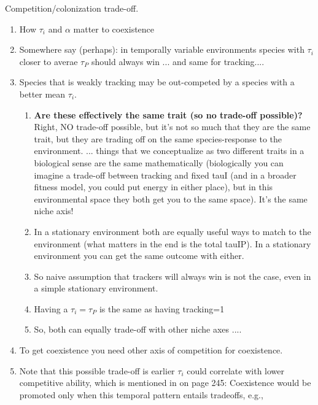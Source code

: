 \documentclass[11pt,letterpaper]{article}
\begin{document}
\begin{enumerate}
\begin{enumerate}
Competition/colonization trade-off.
\begin{enumerate}
\item How $\tau_i$ and $\alpha$ matter to coexistence
\item Somewhere say (perhaps): in temporally variable environments species with $\tau_i$ closer to averae $\tau_{P}$ should always win ... and same for tracking....
\item Species that is weakly tracking may be out-competed by a species with a better mean $\tau_i$. 
\begin{enumerate}
\item {\bf Are these effectively the same trait (so no trade-off possible)?} Right, NO trade-off possible, but it's not so much that they are the same trait, but they are trading off on the same species-response to the environment. ... things that we conceptualize as two different traits in a biological sense are the same mathematically (biologically you can imagine a trade-off between tracking and fixed tauI (and in a broader fitness model, you could put energy in either place), but in this environmental space they both get you to the same space). It's the same niche axis!
\item  In a stationary environment both are equally useful ways to match to the environment (what matters in the end is the total tauIP). In a stationary environment you can get the same outcome with either. 
\item So naive assumption that trackers will always win is not the case, even in a simple stationary environment.
\item Having a $\tau_i = \tau_P$ is the same as having tracking=1
\item So, both can equally trade-off with other niche axes .... 
\end{enumerate}
\item To get coexistence you need other axis of competition for coexistence. \item Note that this possible trade-off is earlier \(\tau_{i}\) could correlate with lower competitive ability, which is mentioned in \citet{Chesson:2004eo} on page 245: Coexistence would be promoted only when this temporal pattern entails tradeoffs, e.g.,

\end{enumerate}
\end{enumerate}
\end{enumerate}
\end{document}
